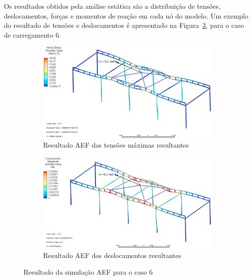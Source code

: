 Os resultados obtidos pela análise estática são a distribuição de tensões,
deslocamentos, forças e momentos de reação em cada nó do modelo. Um exemplo do
resultado de tensões e deslocamentos é apresentado na Figura~\ref{fig::res_FEA},
para o caso de carregamento 6.

\begin{figure}[h]
    \centering
    \begin{subfigure}[b]{0.8\textwidth}
        \includegraphics[width=\textwidth]{figs/res_FEA_tensoes}
        \caption{Resultado AEF das tensões máximas resultantes}
        \label{fig::res_FEA_tensoes}
    \end{subfigure}
    \quad %
    \begin{subfigure}[b]{0.8\textwidth}
        \includegraphics[width=\textwidth]{figs/res_FEA_desloc}
        \caption{Resultado AEF dos deslocamentos resultantes}
        \label{fig::res_FEA_desloc}
    \end{subfigure}
    \caption{Resultado da simulação AEF para o caso 6}
    \label{fig::res_FEA}
\end{figure}

